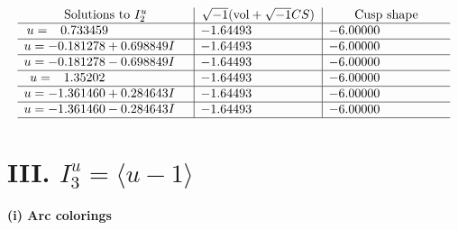 \documentclass[1p]{elsarticle_modified}
\theoremstyle{definition}
\newcommand{\I}{\sqrt{-1}}
\begin{document}
$$\begin{array}{c|c|c}  
\text{Solutions to }I^u_{2}& \I (\text{vol} + \sqrt{-1}CS) & \text{Cusp shape}\\
 \hline 
\begin{aligned}
u &= \phantom{-}0.733459\phantom{ +0.000000I}\end{aligned}
 & -1.64493\phantom{ +0.000000I} & -6.00000\phantom{ +0.000000I} \\ \hline\begin{aligned}
u &= -0.181278 + 0.698849 I\end{aligned}
 & -1.64493\phantom{ +0.000000I} & -6.00000\phantom{ +0.000000I} \\ \hline\begin{aligned}
u &= -0.181278 - 0.698849 I\end{aligned}
 & -1.64493\phantom{ +0.000000I} & -6.00000\phantom{ +0.000000I} \\ \hline\begin{aligned}
u &= \phantom{-}1.35202\phantom{ +0.000000I}\end{aligned}
 & -1.64493\phantom{ +0.000000I} & -6.00000\phantom{ +0.000000I} \\ \hline\begin{aligned}
u &= -1.361460 + 0.284643 I\end{aligned}
 & -1.64493\phantom{ +0.000000I} & -6.00000\phantom{ +0.000000I} \\ \hline\begin{aligned}
u &= -1.361460 - 0.284643 I\end{aligned}
 & -1.64493\phantom{ +0.000000I} & -6.00000\phantom{ +0.000000I}\\
 \hline 
 \end{array}$$\newpage\newpage\renewcommand{\arraystretch}{1}
\centering \section*{III. $I^u_{3}= \langle u-1 \rangle$}
\flushleft \textbf{(i) Arc colorings}\\
\end{document}
